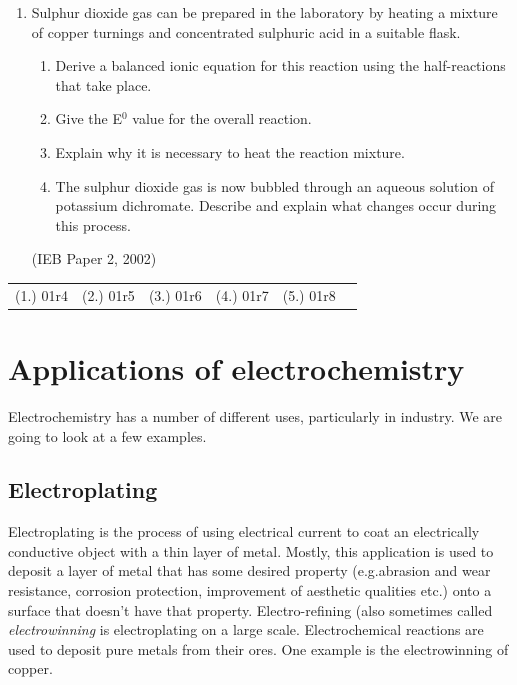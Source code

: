 {\begin{enumerate}
(IEB Paper 2, 2002)

\item{Sulphur dioxide gas can be prepared in the laboratory by heating a mixture of copper turnings and concentrated sulphuric acid in a suitable flask.}	
	\begin{enumerate}
	\item{Derive a balanced ionic equation for this reaction using the half-reactions that take place.}
	\item{Give the E$^{0}$ value for the overall reaction.}
	\item{Explain why it is necessary to heat the reaction mixture.}
	\item{The sulphur dioxide gas is now bubbled through an aqueous solution of potassium dichromate. Describe and explain what changes occur during this process.}
	\end{enumerate}
(IEB Paper 2, 2002)
\end{enumerate}

\par \practiceinfo
\par \begin{tabular}[h]{cccccc}
(1.)	01r4	&
(2.)	01r5	&
(3.)	01r6	&
(4.)	01r7	&
(5.)	01r8	&
\end{tabular}

}






\section{Applications of electrochemistry}
\label{sec:electrochemical:applications}

Electrochemistry has a number of different uses, particularly in industry. We are going to look at a few examples.

\subsection{Electroplating}

Electroplating is the process of using electrical current to coat an electrically conductive object with a thin layer of metal. Mostly, this application is used to deposit a layer of metal that has some desired property (e.g.\@ abrasion and wear resistance, corrosion protection, improvement of aesthetic qualities etc.) onto a surface that doesn't have that property. Electro-refining (also sometimes called \textit{electrowinning} is electroplating on a large scale. Electrochemical reactions are used to deposit pure metals from their ores. One example is the electrowinning of copper.\\

